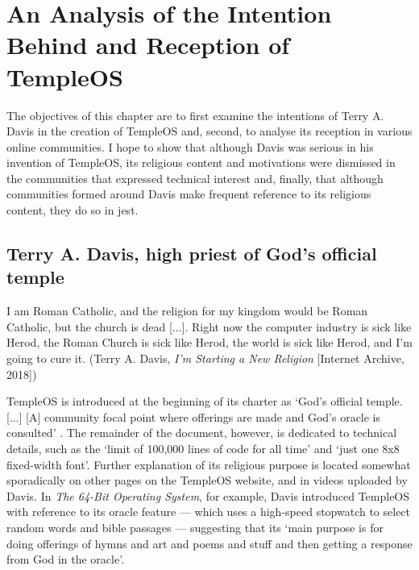 \documentclass[Draft.tex]{subfiles}
\begin{document}
\chapter{An Analysis of the Intention Behind and Reception of TempleOS}

The objectives of this chapter are to first examine
the intentions of Terry A. Davis in the creation of TempleOS and, second,
to analyse its reception in various online communities.
I hope to show that although Davis was serious in his invention of TempleOS,
its religious content and motivations were dismissed
in the communities that expressed technical interest and, finally,
that although communities formed around Davis make frequent reference
to its religious content, they do so in jest.


\section*{Terry A. Davis, high priest of God's official temple}

\begin{displayquote}
  I am Roman Catholic, and the religion for my kingdom
  would be Roman Catholic, but the church is dead [...].
  Right now the computer industry is sick like Herod,
  the Roman Church is sick like Herod,
  the world is sick like Herod, and I'm going to cure it.
	(Terry A. Davis, \textit{I'm Starting a New Religion} [Internet Archive, 2018])
\end{displayquote}

TempleOS is introduced at the beginning of its charter as
`God's official temple. [...] [A] community focal point
where offerings are made and God's oracle is consulted' \parencite{Charter}.
The remainder of the document, however, is dedicated to technical details,
such as the `limit of 100,000 lines of code for all time'
and `just one 8x8 fixed-width font'.
Further explanation of its religious purpose is located somewhat sporadically
on other pages on the TempleOS website, and in videos uploaded by Davis.
In \textit{The 64-Bit Operating System}, for example,
Davis \parencite*{64-Bit} introduced TempleOS
with reference to its oracle feature --- which uses a high-speed
stopwatch to select random words and bible passages --- suggesting that its
`main purpose is for doing offerings of hymns and art and poems and stuff
and then getting a response from God in the oracle'.
\end{document}
